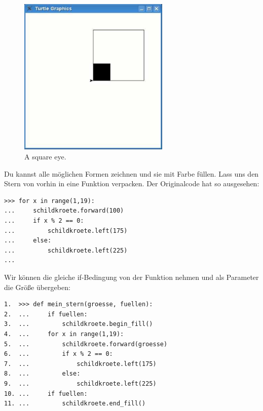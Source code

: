 \begin{figure}
\begin{center}
\includegraphics[width=72mm]{images/figure28}
\end{center}
\caption{A square eye.}\label{fig28}
\end{figure}

Du kannst alle möglichen Formen zeichnen und sie mit Farbe füllen. Lass uns den Stern von vorhin in eine Funktion verpacken. Der Originalcode hat so ausgesehen:

\begin{Verbatim}[frame=single]
>>> for x in range(1,19):
...     schildkroete.forward(100)
...     if x % 2 == 0:
...         schildkroete.left(175)
...     else:
...         schildkroete.left(225)
...
\end{Verbatim}

Wir können die gleiche if-Bedingung von der  Funktion nehmen und als Parameter die Größe übergeben:

\begin{Verbatim}[frame=single]
1.  >>> def mein_stern(groesse, fuellen):
2.  ...     if fuellen:
3.  ...         schildkroete.begin_fill()
4.  ...     for x in range(1,19):
5.  ...         schildkroete.forward(groesse)
6.  ...         if x % 2 == 0:
7.  ...             schildkroete.left(175)
8.  ...         else:
9.  ...             schildkroete.left(225)
10. ...     if fuellen:
11. ...         schildkroete.end_fill()
\end{Verbatim}

